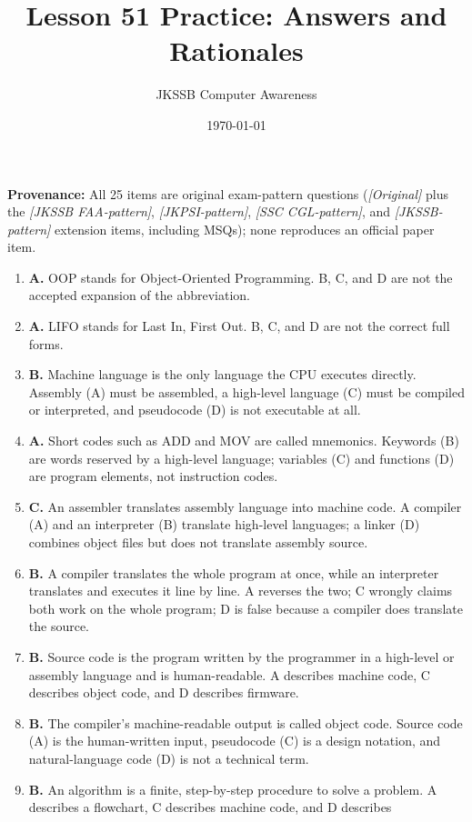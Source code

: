 \documentclass[11pt]{article}
\title{Lesson 51 Practice: Answers and Rationales}
\author{JKSSB Computer Awareness}
\date{\today}
\begin{document}
\maketitle
\noindent\textbf{Provenance:} All 25 items are original exam-pattern questions (\textit{[Original]} plus the \textit{[JKSSB FAA-pattern]}, \textit{[JKPSI-pattern]}, \textit{[SSC CGL-pattern]}, and \textit{[JKSSB-pattern]} extension items, including MSQs); none reproduces an official paper item.
\begin{enumerate}[label=\textbf{Q\arabic*.}, leftmargin=*]
\item \textbf{A.} OOP stands for Object-Oriented Programming. B, C, and D are
  not the accepted expansion of the abbreviation.
\item \textbf{A.} LIFO stands for Last In, First Out. B, C, and D are not the
  correct full forms.
\item \textbf{B.} Machine language is the only language the CPU executes
  directly. Assembly (A) must be assembled, a high-level language (C) must be
  compiled or interpreted, and pseudocode (D) is not executable at all.
\item \textbf{A.} Short codes such as ADD and MOV are called mnemonics.
  Keywords (B) are words reserved by a high-level language; variables (C) and
  functions (D) are program elements, not instruction codes.
\item \textbf{C.} An assembler translates assembly language into machine
  code. A compiler (A) and an interpreter (B) translate high-level
  languages; a linker (D) combines object files but does not translate
  assembly source.
\item \textbf{B.} A compiler translates the whole program at once, while an
  interpreter translates and executes it line by line. A reverses the two;
  C wrongly claims both work on the whole program; D is false because a
  compiler does translate the source.
\item \textbf{B.} Source code is the program written by the programmer in a
  high-level or assembly language and is human-readable. A describes machine
  code, C describes object code, and D describes firmware.
\item \textbf{B.} The compiler's machine-readable output is called object
  code. Source code (A) is the human-written input, pseudocode (C) is a
  design notation, and natural-language code (D) is not a technical term.
\item \textbf{B.} An algorithm is a finite, step-by-step procedure to solve a
  problem. A describes a flowchart, C describes machine code, and D describes

\end{enumerate}
\end{document}
